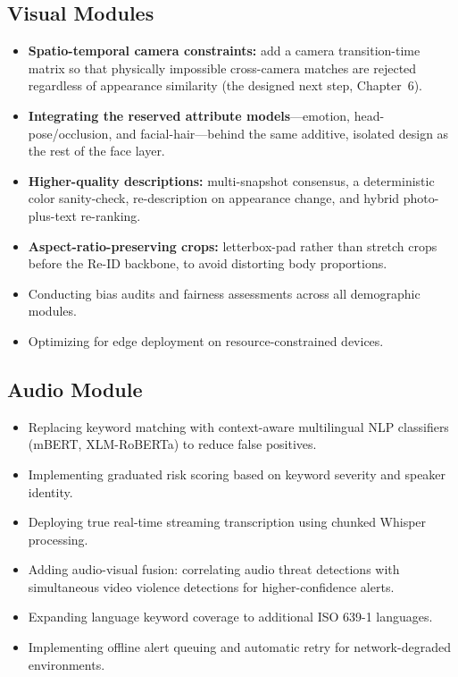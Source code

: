 \documentclass[12pt]{report}
\begin{document}
\subsection{Visual Modules}
\begin{itemize}
    \item \textbf{Spatio-temporal camera constraints:} add a camera transition-time matrix so that physically impossible cross-camera matches are rejected regardless of appearance similarity (the designed next step, Chapter~6).
    \item \textbf{Integrating the reserved attribute models}---emotion, head-pose/occlusion, and facial-hair---behind the same additive, isolated design as the rest of the face layer.
    \item \textbf{Higher-quality descriptions:} multi-snapshot consensus, a deterministic color sanity-check, re-description on appearance change, and hybrid photo-plus-text re-ranking.
    \item \textbf{Aspect-ratio-preserving crops:} letterbox-pad rather than stretch crops before the Re-ID backbone, to avoid distorting body proportions.
    \item Conducting bias audits and fairness assessments across all demographic modules.
    \item Optimizing for edge deployment on resource-constrained devices.
\end{itemize}

\subsection{Audio Module}
\begin{itemize}
    \item Replacing keyword matching with context-aware multilingual NLP classifiers (mBERT, XLM-RoBERTa) to reduce false positives.
    \item Implementing graduated risk scoring based on keyword severity and speaker identity.
    \item Deploying true real-time streaming transcription using chunked Whisper processing.
    \item Adding audio-visual fusion: correlating audio threat detections with simultaneous video violence detections for higher-confidence alerts.
    \item Expanding language keyword coverage to additional ISO 639-1 languages.
    \item Implementing offline alert queuing and automatic retry for network-degraded environments.
\end{itemize}
\end{document}
